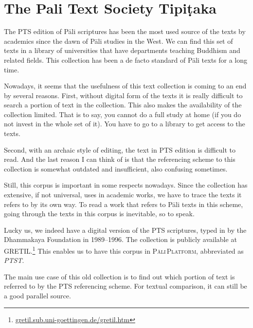 
\section{The Pali Text Society Tipiṭaka}

The PTS edition of Pāli scriptures has been the most used source of the texts by academics since the dawn of Pāli studies in the West. We can find this set of texts in a library of universities that have departments teaching Buddhism and related fields. This collection has been a de facto standard of Pāli texts for a long time.

Nowadays, it seems that the usefulness of this text collection is coming to an end by several reasons. First, without digital form of the texts it is really difficult to search a portion of text in the collection. This also makes the availability of the collection limited. That is to say, you cannot do a full study at home (if you do not invest in the whole set of it). You have to go to a library to get access to the texts.

Second, with an archaic style of editing, the text in PTS edition is difficult to read. And the last reason I can think of is that the referencing scheme to this collection is somewhat outdated and insufficient, also confusing sometimes.

Still, this corpus is important in some respects nowadays. Since the collection has extensive, if not universal, uses in academic works, we have to trace the texts it refers to by its own way. To read a work that refers to Pāli texts in this scheme, going through the texts in this corpus is inevitable, so to speak.

Lucky us, we indeed have a digital version of the PTS scriptures, typed in by the Dhammakaya Foundation in 1989--1996. The collection is publicly available at GRETIL.\footnote{\url{gretil.sub.uni-goettingen.de/gretil.htm}} This enables us to have this corpus in \textsc{Pāli\,Platform}, abbreviated as \emph{PTST}.

The main use case of this old collection is to find out which portion of text is referred to by the PTS referencing scheme. For textual comparison, it can still be a good parallel source.

